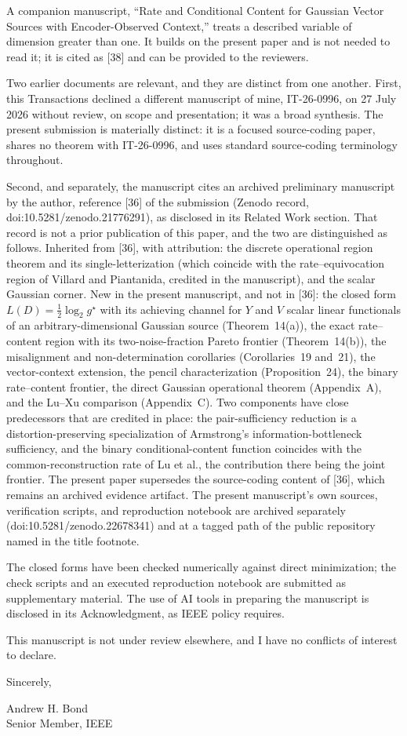 \documentclass[11pt]{article}
\begin{document}
A companion manuscript, ``Rate and Conditional Content for Gaussian
Vector Sources with Encoder-Observed Context,'' treats a described
variable of dimension greater than one. It builds on the present paper
and is not needed to read it; it is cited as [38] and can be provided to
the reviewers.

Two earlier documents are relevant, and they are distinct from one
another. First, this Transactions declined a different manuscript of
mine, IT-26-0996, on 27 July 2026 without review, on scope and
presentation; it was a broad synthesis. The present submission is
materially distinct: it is a focused source-coding paper, shares no
theorem with IT-26-0996, and uses standard source-coding terminology
throughout.

\newpage
Second, and separately, the manuscript cites an archived preliminary
manuscript by the author, reference [36] of the submission (Zenodo record,
doi:10.5281/zenodo.21776291), as disclosed in its Related Work section.
That record is not a prior publication of this paper, and the two are
distinguished as follows. Inherited from [36], with attribution: the
discrete operational region theorem and its single-letterization (which
coincide with the rate--equivocation region of Villard and Piantanida,
credited in the manuscript), and the
scalar Gaussian corner. New in the present manuscript, and not in [36]:
the closed form $L(D)=\tfrac12\log_2 g^\star$ with its achieving channel
for $Y$ and $V$ scalar linear functionals of an arbitrary-dimensional
Gaussian source (Theorem~14(a)), the exact rate--content region with its
two-noise-fraction Pareto frontier (Theorem~14(b)), the misalignment and
non-determination corollaries (Corollaries~19 and~21), the vector-context
extension, the pencil characterization (Proposition~24), the binary rate--content frontier, the direct Gaussian
operational theorem (Appendix~A), and the Lu--Xu comparison (Appendix~C). Two components have
close predecessors that are credited in place: the pair-sufficiency
reduction is a distortion-preserving specialization of Armstrong's
information-bottleneck sufficiency, and the binary conditional-content
function coincides with the common-reconstruction rate of Lu et al., the
contribution there being the joint frontier. The present paper supersedes
the source-coding content of [36], which remains an archived evidence
artifact. The present manuscript's own sources, verification scripts, and
reproduction notebook are archived separately (doi:10.5281/zenodo.22678341)
and at a tagged path of the public repository named in the title
footnote.

The closed forms have been checked numerically against direct
minimization; the check scripts and an executed reproduction notebook are
submitted as supplementary material. The use of AI tools in preparing the
manuscript is disclosed in its Acknowledgment, as IEEE policy requires.

This manuscript is not under review elsewhere, and I have no conflicts of
interest to declare.

Sincerely,

Andrew H. Bond\\
Senior Member, IEEE
\end{document}
